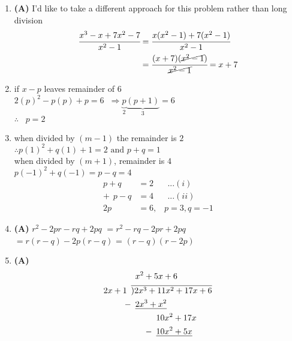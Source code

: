 \begin{multicols}{2}
\begin{enumerate}[label={\textbf{\arabic*.}}]
    \item \textbf{(A)} I'd like to take a different approach for this problem rather than long division \\
    \begin{align*} 
        \cfrac{x^3 - x  + 7x^2 - 7}{x^2 - 1} & = \cfrac{x(x^2 -1) + 7(x^2 -1)}{x^2 - 1}  \\
        & = \cfrac{(x+7)(\cancel{x^2 - 1})}{\cancel{x^2 -1}} = x+7
    \end{align*}
    \item if $x-p$ leaves remainder of 6  \\
    $2(p)^2 -p(p) + p = 6 \hspace{7pt} \Rightarrow  \underbrace{p}_{2} \underbrace{(p+1)}_{3} = 6$ \\
    $\therefore \hspace{10pt} p = 2$
    \item when divided by $(m-1)$ the remainder is $2$ \\
    $\therefore p(1)^2 + q(1) + 1 = 2 \text{ and } p + q = 1$\\
    when divided by $(m+1)$, remainder is $4$ \\
    $p(-1)^2 + q(-1) = p -q = 4$
    \begin{align*} 
        p + q &= 2 \hspace{20pt} ...(i) \\
       +\hspace{5pt}  p - q &= 4 \hspace{20pt} ...(ii) \\
       2p & = 6, \hspace{10pt} p = 3, q = -1
    \end{align*}
    \item \textbf{(A)} 
        $r^2 -2pr - rq + 2pq$ $= r^2 - rq - 2pr + 2pq$  \\
        $= r(r-q) -2p(r-q)$ = $ (r-q)(r-2p)$
    \item \textbf{(A)} \begin{align*}
        & \hspace{5pt} x^2 + 5x + 6 \\
        2x + 1\hspace{5pt} & \overline{)2x^3 + 11x^2 + 17x + 6} \\
        -& \hspace{5pt} \underline{2x^3 + x^2} \\
        & \hspace{30pt} 10x^2 + 17x \\
       -\hspace{-25pt} & \hspace{30pt} \underline{10x^2 + 5x}\\

\end{align*}
\end{enumerate}
\end{multicols}

